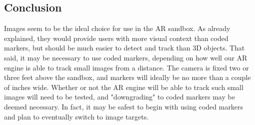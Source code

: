 \documentclass[letterpaper, 10pt, onecolumn, draftclsnofoot]{IEEEtran}
\begin{document}
\subsection{Conclusion}
Images seem to be the ideal choice for use in the AR sandbox. As already explained, they would provide users with more visual context than coded markers, but should be much easier to detect and track than 3D objects. That said, it may be necessary to use coded markers, depending on how well our AR engine is able to track small images from a distance. The camera is fixed two or three feet above the sandbox, and markers will ideally be no more than a couple of inches wide. Whether or not the AR engine will be able to track such small images will need to be tested, and "downgrading" to coded markers may be deemed necessary. In fact, it may be safest to begin with using coded markers and plan to eventually switch to image targets.
\end{document}
